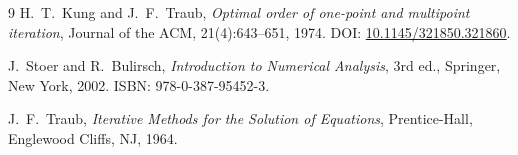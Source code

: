 \documentclass[11pt]{article}
\begin{document}
\begin{thebibliography}{9}
H.~T.~Kung and J.~F.~Traub,
\textit{Optimal order of one-point and multipoint iteration},
Journal of the ACM, 21(4):643--651, 1974.
DOI: \href{https://doi.org/10.1145/321850.321860}{10.1145/321850.321860}.

J.~Stoer and R.~Bulirsch,
\textit{Introduction to Numerical Analysis}, 3rd ed.,
Springer, New York, 2002.
ISBN: 978-0-387-95452-3.

J.~F.~Traub,
\textit{Iterative Methods for the Solution of Equations},
Prentice-Hall, Englewood Cliffs, NJ, 1964.
\end{thebibliography}
\end{document}
